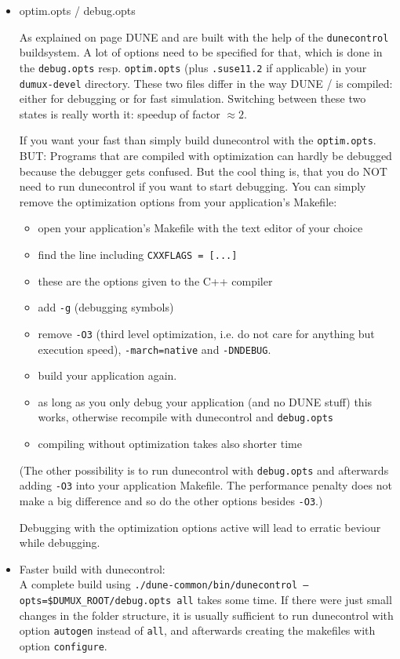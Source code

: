 \begin{itemize}
\item optim.opts / debug.opts

As explained on page \pageref{buildIt} DUNE and \Dumux are built with the help of the \verb+dunecontrol+ buildsystem. 
A lot of options need to be specified for that, which is done in the \verb+debug.opts+ resp. \verb+optim.opts+ 
(plus \verb+.suse11.2+ if applicable) in your \verb+dumux-devel+ directory. These two files differ in the way DUNE / \Dumux is compiled: either for debugging or for fast simulation. Switching between these two states is really 
worth it: speedup of factor $\approx 2$. 

If you want your \Dumux fast than simply build dunecontrol with the \verb+optim.opts+. BUT: Programs that are compiled with optimization can hardly 
be debugged because the debugger gets confused. But the cool thing is, that you do NOT need to run dunecontrol if you want to start debugging. You can simply remove the optimization options from your application's Makefile:
\begin{itemize}
\item open your application's Makefile with the text editor of your choice
\item find the line including \verb+CXXFLAGS = [...]+
\item these are the options given to the C++ compiler
\item add \verb+-g+ (debugging symbols)
\item remove  \verb+-O3+ (third level optimization, i.e. do not care for anything but execution speed),  \verb+-march=native+ and \verb+-DNDEBUG+.
\item build your application again. 
\item as long as you only debug your application (and no DUNE stuff) this works, otherwise recompile with dunecontrol and \verb+debug.opts+
\item compiling without optimization takes also shorter time
\end{itemize}

(The other possibility is to run dunecontrol with \verb+debug.opts+ and afterwards adding \verb+-O3+ into your application Makefile. The performance  penalty does not make a big difference and so do the other options besides \verb+-O3+.)

Debugging with the optimization options active will lead to erratic beviour while debugging. 

\item Faster build with dunecontrol:\\
A complete build using \texttt{./dune-common/bin/dunecontrol --opts=\$DUMUX\_ROOT/debug.opts all} takes some time. If there were just small changes in the folder structure, it is usually sufficient to run dunecontrol with option \texttt{autogen} instead of \texttt{all}, and afterwards creating the makefiles with option \texttt{configure}.

\end{itemize}

